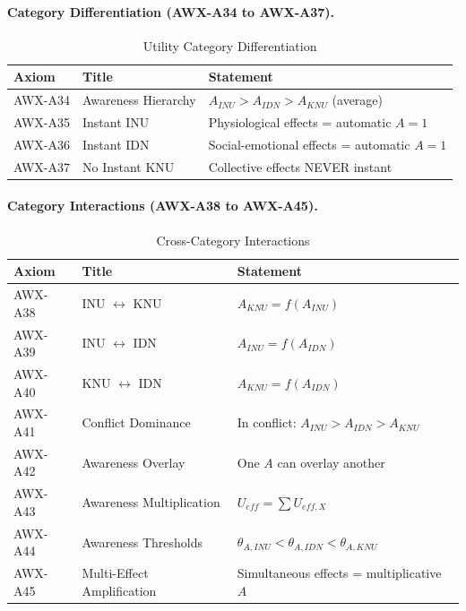 \paragraph{Category Differentiation (AWX-A34 to AWX-A37).}

\begin{table}[htbp]
\centering
\caption{Utility Category Differentiation}
\label{tab:category-differentiation}
\renewcommand{\arraystretch}{1.3}
\begin{tabular}{@{}llp{6cm}@{}}
\toprule
\textbf{Axiom} & \textbf{Title} & \textbf{Statement} \\
\midrule
AWX-A34 & Awareness Hierarchy & $A_{INU} > A_{IDN} > A_{KNU}$ (average) \\
AWX-A35 & Instant INU & Physiological effects = automatic $A = 1$ \\
AWX-A36 & Instant IDN & Social-emotional effects = automatic $A = 1$ \\
AWX-A37 & No Instant KNU & Collective effects NEVER instant \\
\bottomrule
\end{tabular}
\end{table}

\paragraph{Category Interactions (AWX-A38 to AWX-A45).}

\begin{table}[htbp]
\centering
\caption{Cross-Category Interactions}
\label{tab:category-interactions}
\renewcommand{\arraystretch}{1.3}
\begin{tabular}{@{}llp{6cm}@{}}
\toprule
\textbf{Axiom} & \textbf{Title} & \textbf{Statement} \\
\midrule
AWX-A38 & INU $\leftrightarrow$ KNU & $A_{KNU} = f(A_{INU})$ \\
AWX-A39 & INU $\leftrightarrow$ IDN & $A_{INU} = f(A_{IDN})$ \\
AWX-A40 & KNU $\leftrightarrow$ IDN & $A_{KNU} = f(A_{IDN})$ \\
AWX-A41 & Conflict Dominance & In conflict: $A_{INU} > A_{IDN} > A_{KNU}$ \\
AWX-A42 & Awareness Overlay & One $A$ can overlay another \\
AWX-A43 & Awareness Multiplication & $U_{eff} = \sum U_{eff,X}$ \\
AWX-A44 & Awareness Thresholds & $\theta_{A,INU} < \theta_{A,IDN} < \theta_{A,KNU}$ \\
AWX-A45 & Multi-Effect Amplification & Simultaneous effects = multiplicative $A$ \\
\bottomrule
\end{tabular}
\end{table}

